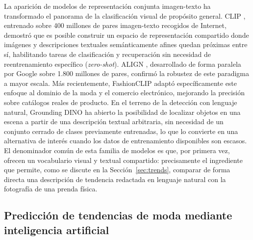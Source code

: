\documentclass[conference]{IEEEtran}
\begin{document}
La aparición de modelos de representación conjunta imagen-texto ha
transformado el panorama de la clasificación visual de propósito general.
CLIP \cite{radford2021clip}, entrenado sobre 400 millones de pares
imagen-texto recogidos de Internet, demostró que es posible construir un
espacio de representación compartido donde imágenes y descripciones
textuales semánticamente afines quedan próximas entre sí, habilitando
tareas de clasificación y recuperación sin necesidad de reentrenamiento
específico (\emph{zero-shot}). ALIGN \cite{jia2021align}, desarrollado de
forma paralela por Google sobre 1.800 millones de pares, confirmó la
robustez de este paradigma a mayor escala. Más recientemente, FashionCLIP
\cite{chia2022fashionclip} adaptó específicamente este enfoque al dominio de
la moda y el comercio electrónico, mejorando la precisión sobre catálogos
reales de producto. En el terreno de la detección con lenguaje natural,
Grounding DINO \cite{liu2023groundingdino} ha abierto la posibilidad de
localizar objetos en una escena a partir de una descripción textual
arbitraria, sin necesidad de un conjunto cerrado de clases previamente
entrenadas, lo que lo convierte en una alternativa de interés cuando los
datos de entrenamiento disponibles son escasos. El denominador común de esta
familia de modelos es que, por primera vez, ofrecen un vocabulario visual y
textual compartido: precisamente el ingrediente que permite, como se discute
en la Sección~\ref{sec:trends}, comparar de forma directa una descripción de
tendencia redactada en lenguaje natural con la fotografía de una prenda
física.

\subsection{Predicción de tendencias de moda mediante inteligencia artificial}
\end{document}
